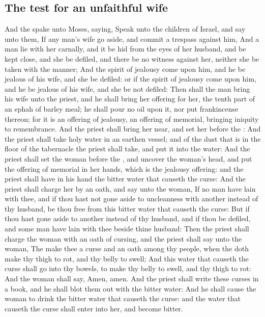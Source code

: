 \begin{biblechapter}
\section*{The test for an unfaithful wife}
\verse And the \LORD spake unto Moses, saying,
\verse Speak unto the children of Israel, and say unto them, If any man's wife go aside, and commit a trespass against him,
\verse And a man lie with her carnally, and it be hid from the eyes of her husband, and be kept close, and she be defiled, and there be no witness against her, neither she be taken with the manner;
\verse And the spirit of jealousy come upon him, and he be jealous of his wife, and she be defiled: or if the spirit of jealousy come upon him, and he be jealous of his wife, and she be not defiled:
\verse Then shall the man bring his wife unto the priest, and he shall bring her offering for her, the tenth part of an ephah of barley meal; he shall pour no oil upon it, nor put frankincense thereon; for it is an offering of jealousy, an offering of memorial, bringing iniquity to remembrance.
\verse And the priest shall bring her near, and set her before the \LORD:
\verse And the priest shall take holy water in an earthen vessel; and of the dust that is in the floor of the tabernacle the priest shall take, and put it into the water:
\verse And the priest shall set the woman before the \LORD, and uncover the woman's head, and put the offering of memorial in her hands, which is the jealousy offering: and the priest shall have in his hand the bitter water that causeth the curse:
\verse And the priest shall charge her by an oath, and say unto the woman, If no man have lain with thee, and if thou hast not gone aside to uncleanness with another instead of thy husband, be thou free from this bitter water that causeth the curse:
\verse But if thou hast gone aside to another instead of thy husband, and if thou be defiled, and some man have lain with thee beside thine husband:
\verse Then the priest shall charge the woman with an oath of cursing, and the priest shall say unto the woman, The \LORD make thee a curse and an oath among thy people, when the \LORD doth make thy thigh to rot, and thy belly to swell;
\verse And this water that causeth the curse shall go into thy bowels, to make thy belly to swell, and thy thigh to rot: And the woman shall say, Amen, amen.
\verse And the priest shall write these curses in a book, and he shall blot them out with the bitter water:
\verse And he shall cause the woman to drink the bitter water that causeth the curse: and the water that causeth the curse shall enter into her, and become bitter.

\end{biblechapter}
